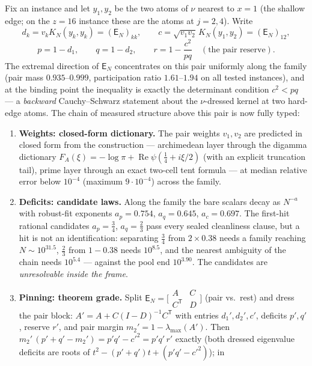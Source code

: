 \documentclass[11pt]{article}
\theoremstyle{remark}
\newcommand{\E}{\mathsf{E}}
\begin{document}
Fix an instance and let $y_{1},y_{2}$ be the two atoms of $\nu$
nearest to $x=1$ (the shallow edge; on the $z=16$ instance these are
the atoms at $j=2,4$).  Write
\[
d_{k}=v_{k}K_{N}(y_{k},y_{k})=(\E_{N})_{kk},\qquad
c=\sqrt{v_{1}v_{2}}\,K_{N}(y_{1},y_{2})=(\E_{N})_{12},
\]
\[
p=1-d_{1},\qquad q=1-d_{2},\qquad
r=1-\frac{c^{2}}{pq}\quad(\text{the pair reserve}).
\]
The extremal direction of $\E_{N}$ concentrates on this pair
uniformly along the family (pair mass $0.935$--$0.999$,
participation ratio $1.61$--$1.94$ on all tested instances), and at
the binding point the inequality is exactly the determinant
condition $c^{2}<pq$ --- a \emph{backward} Cauchy--Schwarz statement
about the $\nu$-dressed kernel at two hard-edge atoms.  The chain of
measured structure above this pair is now fully typed:

\begin{enumerate}
\item \textbf{Weights: closed-form dictionary.}  The pair weights
$v_{1},v_{2}$ are predicted in closed form from the construction ---
archimedean layer through the digamma dictionary
$F_{A}(\xi)=-\log\pi+\operatorname{Re}\psi(\tfrac14+i\xi/2)$ (with an
explicit truncation tail), prime layer through an exact two-cell
tent formula --- at median relative error below $10^{-4}$ (maximum
$9\cdot10^{-4}$) across the family.
\item \textbf{Deficits: candidate laws.}  Along the family the bare
scalars decay as $N^{-a}$ with robust-fit exponents
$a_{p}=0.754$, $a_{q}=0.645$, $a_{c}=0.697$.  The first-hit rational
candidates $a_{p}=\tfrac34$, $a_{q}=\tfrac23$ pass every sealed
cleanliness clause, but a hit is not an identification: separating
$\tfrac34$ from $2\times0.38$ needs a family reaching
$N\sim10^{31.5}$, $\tfrac23$ from $1-0.38$ needs $10^{8.5}$, and the
nearest ambiguity of the chain needs $10^{5.4}$ --- against the pool
end $10^{3.90}$.  The candidates are \emph{unresolvable inside the
frame}.
\item \textbf{Pinning: theorem grade.}  Split
$\E_{N}=\bigl[\begin{smallmatrix}A&C\\C^{\mathsf T}&D\end{smallmatrix}\bigr]$
(pair vs.\ rest) and dress the pair block:
$A'=A+C(I-D)^{-1}C^{\mathsf T}$ with entries $d_{1}',d_{2}',c'$,
deficits $p',q'$, reserve $r'$, and pair margin
$m_{2}'=1-\lambda_{\max}(A')$.  Then
$m_{2}'\,(p'+q'-m_{2}')=p'q'-c'^{2}=p'q'\,r'$ exactly (both dressed
eigenvalue deficits are roots of $t^{2}-(p'+q')t+(p'q'-c'^{2})$); in

\end{enumerate}
\end{document}
